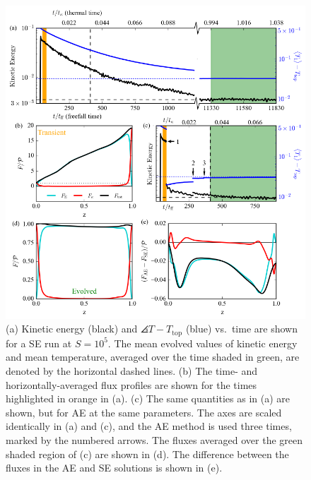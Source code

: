\begin{figure}[p!]
\includegraphics[width=\textwidth]{./figs/time_trace.pdf}
\caption[Time evolution traces of an AE and SE convective simulation]
{
	(a) Kinetic energy (black) and $\angles{T} - T_{\text{top}}$ (blue)  vs.~time are shown for a SE run at $S = 10^5$. 
	The mean evolved values of kinetic energy and mean temperature, averaged over the time shaded in green, are denoted by the horizontal dashed lines. 
	(b) The time- and horizontally-averaged flux profiles are shown for the times highlighted in orange in (a).
	(c) The same quantities as in (a) are shown, but for AE at the same parameters.
	The axes are scaled identically in (a) and (c), and the AE method is used three times, marked by the numbered arrows. 
	The fluxes averaged over the green shaded region of (c) are shown in (d). 
	The difference between the fluxes in the AE and SE solutions is shown in (e). 
	\label{fig:time_trace} 
}
\end{figure}


